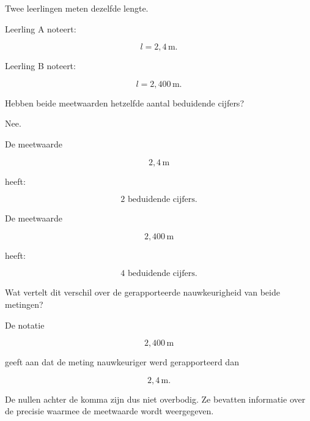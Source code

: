 \documentclass{ximera}
\begin{document}
\begin{oefening}{\oefU}

Twee leerlingen meten dezelfde lengte.

Leerling A noteert:

\[
l=2{,}4\,\si{\meter}.
\]

Leerling B noteert:

\[
l=2{,}400\,\si{\meter}.
\]

\begin{question}
Hebben beide meetwaarden hetzelfde aantal beduidende cijfers?

\begin{oplossing}
Nee.

De meetwaarde

\[
2{,}4\,\si{\meter}
\]

heeft:

\[
\boxed{2\text{ beduidende cijfers}}.
\]

De meetwaarde

\[
2{,}400\,\si{\meter}
\]

heeft:

\[
\boxed{4\text{ beduidende cijfers}}.
\]
\end{oplossing}
\end{question}


\begin{question}
Wat vertelt dit verschil over de gerapporteerde nauwkeurigheid van beide
metingen?

\begin{oplossing}
De notatie

\[
2{,}400\,\si{\meter}
\]

geeft aan dat de meting nauwkeuriger werd gerapporteerd dan

\[
2{,}4\,\si{\meter}.
\]

De nullen achter de komma zijn dus niet overbodig. Ze bevatten informatie
over de precisie waarmee de meetwaarde wordt weergegeven.
\end{oplossing}
\end{question}

\end{oefening}
\end{document}
